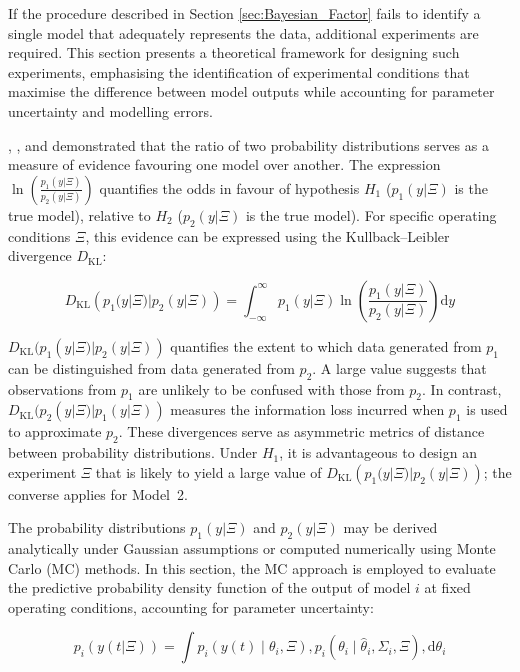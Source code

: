 \documentclass[../Article_Design_of_Experiment.tex]{subfiles}
\begin{document}
If the procedure described in Section \ref{sec:Bayesian_Factor} fails to identify a single model that adequately represents the data, additional experiments are required. This section presents a theoretical framework for designing such experiments, emphasising the identification of experimental conditions that maximise the difference between model outputs while accounting for parameter uncertainty and modelling errors.

\citet{Box1967}, \citet{Himmelblau1970}, and \citet{Bard1974} demonstrated that the ratio of two probability distributions serves as a measure of evidence favouring one model over another. The expression $\ln\left( \frac{p_1(y|\Xi)}{p_2(y|\Xi)} \right)$ quantifies the odds in favour of hypothesis $H_1$ (\(p_1(y|\Xi)\) is the true model), relative to $H_2$ (\(p_2(y|\Xi)\) is the true model). For specific operating conditions \(\Xi\), this evidence can be expressed using the Kullback--Leibler divergence \(D_{\mathrm{KL}}\):

{\footnotesize
\begin{equation}
	D_{\mathrm{KL}}\left( p_1(y|\Xi) | p_2(y|\Xi) \right) = \int_{-\infty}^{\infty} p_1(y|\Xi) \ln\left( \frac{p_1(y|\Xi)}{p_2(y|\Xi)} \right) \mathrm{d}y
\end{equation} }

$D_{\mathrm{KL}}(p_1(y|\Xi) | p_2(y|\Xi))$ quantifies the extent to which data generated from $p_1$ can be distinguished from data generated from $p_2$. A large value suggests that observations from $p_1$ are unlikely to be confused with those from $p_2$. In contrast, $D_{\mathrm{KL}}(p_2(y|\Xi) | p_1(y|\Xi))$ measures the information loss incurred when $p_1$ is used to approximate $p_2$. These divergences serve as asymmetric metrics of distance between probability distributions. Under $H_1$, it is advantageous to design an experiment $\Xi$ that is likely to yield a large value of $D_{\mathrm{KL}}\left( p_1(y|\Xi) | p_2(y|\Xi) \right)$; the converse applies for Model~2.

The probability distributions $p_1(y|\Xi)$ and $p_2(y|\Xi)$ may be derived analytically under Gaussian assumptions or computed numerically using Monte Carlo (MC) methods. In this section, the MC approach is employed to evaluate the predictive probability density function of the output of model $i$ at fixed operating conditions, accounting for parameter uncertainty:

{\footnotesize
\begin{equation} \label{EQ:p_i_d_theta}
	p_i(y(t|\Xi)) = \int p_i(y(t)\mid\theta_i, \Xi) , p_i(\theta_i\mid\hat{\theta}_i,\Sigma_i,\Xi) , \mathrm{d}\theta_i
\end{equation} }
\end{document}
